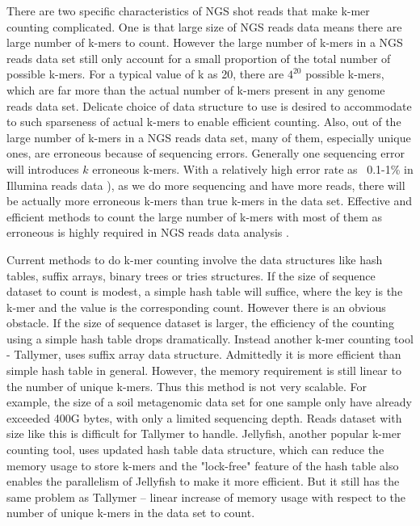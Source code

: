 There are two specific characteristics of NGS shot reads that make k-mer
counting complicated. One is that large size of NGS reads data means there are
large number of
k-mers to count. However the large number of k-mers in a NGS reads data set
still only account for a small proportion of the total number of possible k-mers.
For a typical value of k as 20, there are $4^{20}$ possible k-mers, which are
far more than the actual number of k-mers present in any genome reads data set.
Delicate choice of data structure to use is desired to accommodate to such
sparseness of actual k-mers to enable efficient counting. Also, out of the
large number of k-mers in a NGS reads data set, many of them, especially unique
ones, are erroneous because of sequencing errors. Generally one sequencing error will
introduces $k$ erroneous k-mers. With a relatively high error rate as ~0.1-1\%
in Illumina reads data \cite{pubmed19997069}), as we do more sequencing and have
more reads, there will be actually more erroneous k-mers than true k-mers in
the data set. Effective and efficient methods to count the large number of
k-mers with most of them as erroneous is highly required in NGS reads data
analysis \cite{Minoche2011}.

Current methods to do k-mer counting involve the data structures like hash
tables, suffix arrays, binary trees or tries structures. If the size of
sequence dataset to count is modest, a simple hash table will suffice,
where the key is the k-mer and the value is the corresponding count. However
there is an obvious obstacle. If the size of sequence dataset is larger, the
efficiency of the counting using a simple hash table drops dramatically.
Instead another k-mer counting tool - Tallymer, uses suffix array data
structure\cite{Kurtz2008}. Admittedly it is more efficient than simple hash table in
general. However, the memory requirement is still linear to the number of
unique k-mers. Thus this method is not very scalable. For example,
the size of a soil metagenomic data set for one sample only have already 
exceeded 400G bytes, with only a limited sequencing depth\cite{Howe2014}.
 Reads dataset with size like this is difficult for Tallymer to
handle. Jellyfish, \cite{Marcais2011} another popular k-mer counting tool,
uses updated hash table data structure, which can reduce the memory usage
to store k-mers and the "lock-free" feature of the hash table also enables the
parallelism of Jellyfish to make it more efficient. But it still has the same
problem as Tallymer – linear increase of memory usage with respect to the
number of unique k-mers in the data set to count.

